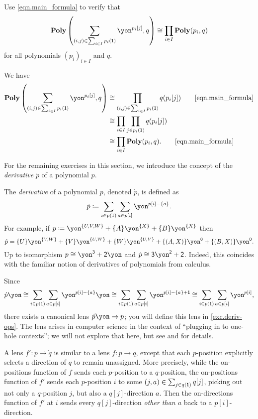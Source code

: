 \documentclass[Book-Poly]{subfiles}
\begin{document}
\begin{exercise}%
Use \eqref{eqn.main_formula} to verify that
\[
    \poly\left(\sum_{(i,j)\in\sum_{i\in I}p_i(\1)}\yon^{p_i[j]}, q\right) \iso \prod_{i \in I}\poly(p_i, q)
\]
for all polynomials $(p_i)_{i\in I}$ and $q$.
\begin{solution}
We have
\begin{align*}
    \poly\left(\sum_{(i,j) \in \sum_{i \in I} p_i(\1)} \yon^{p_i[j]}, q\right) &\iso \prod_{(i,j) \in \sum_{i \in I} p_i(\1)} q(p_i[j])
    \tag*{\eqref{eqn.main_formula}} \\
    &\iso \prod_{i \in I} \prod_{j \in p_i(\1)} q(p_i[j]) \\
    &\iso \prod_{i \in I} \poly(p_i, q).
    \tag*{\eqref{eqn.main_formula}}
\end{align*}
\end{solution}
\end{exercise}

For the remaining exercises in this section, we introduce the concept of the \emph{derivative} $\dot{p}$ of a polynomial $p$.

\begin{example}[Derivatives]\label{ex.derivatives}
The \emph{derivative} of a polynomial $p$, denoted $\dot{p}$, is defined as
\[
  \dot{p}\coloneqq\sum_{i\in p(\1)}\sum_{a\in p[i]}\yon^{p[i]-\{a\}}.
\]
For example, if $p\coloneq\yon^{\{U,V,W\}}+\{A\}\yon^{\{X\}}+\{B\}\yon^{\{X\}}$ then
\[\dot{p}=\{U\}\yon^{\{V,W\}}+\{V\}\yon^{\{U,W\}}+\{W\}\yon^{\{U,V\}}+\{(A,X)\}\yon^\0+\{(B,X)\}\yon^\0.\]
Up to isomorphism $p\cong\yon^\3+\2\yon$ and $\dot{p}\cong\3\yon^\2+\2$.
Indeed, this coincides with the familiar notion of derivatives of polynomials from calculus.

Since
\[
  \dot{p}\yon\iso\sum_{i\in p(\1)}\sum_{a\in p[i]}\yon^{p[i]-\{a\}}\yon\iso\sum_{i\in p(\1)}\sum_{a\in p[i]}\yon^{p[i]-\{a\}+\1}\iso\sum_{i\in p(\1)}\sum_{a\in p[i]}\yon^{p[i]},
\]
there exists a canonical lens $\dot{p}\yon\to p$; you will define this lens in \cref{exc.deriv-ops}.
The lens arises in computer science in the context of ``plugging in to one-hole contexts''; we will not explore that here, but see \cite{mcbride2001derivative} and \cite{abbott2003derivatives} for details.%

A lens $f'\colon p\to \dot{q}$ is similar to a lens $f\colon p\to q$, except that each $p$-position explicitly selects a direction of $q$ to remain unassigned.
More precisely, while the on-positions function of $f$ sends each $p$-position to a $q$-position, the on-positions function of $f'$ sends each $p$-position $i$ to some $(j,a)\in \sum_{j\in q(\textsf{1})}q[j]$, picking out not only a $q$-position $j$, but also a $q[j]$-direction $a$.
Then the on-directions function of $f'$ at $i$ sends every $q[j]$-direction \emph{other than $a$} back to a $p[i]$-direction.
\end{example}
\end{document}
